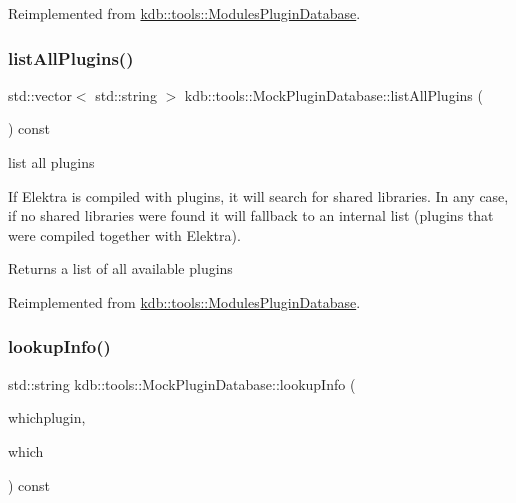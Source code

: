 Reimplemented from \hyperlink{classkdb_1_1tools_1_1ModulesPluginDatabase_a0e81e1b7b296a52f8040fd966b461c3a}{kdb\+::tools\+::\+Modules\+Plugin\+Database}.

\mbox{\label{classkdb_1_1tools_1_1MockPluginDatabase_a3663848683953bfad7123c48c00ab404}} 
\subsubsection{\texorpdfstring{list\+All\+Plugins()}{listAllPlugins()}}
{\footnotesize\ttfamily std\+::vector$<$ std\+::string $>$ kdb\+::tools\+::\+Mock\+Plugin\+Database\+::list\+All\+Plugins (\begin{DoxyParamCaption}{ }\end{DoxyParamCaption}) const\hspace{0.3cm}{\ttfamily [virtual]}}



list all plugins 

If Elektra is compiled with plugins, it will search for shared libraries. In any case, if no shared libraries were found it will fallback to an internal list (plugins that were compiled together with Elektra).

\begin{DoxyReturn}{Returns}
a list of all available plugins 
\end{DoxyReturn}


Reimplemented from \hyperlink{classkdb_1_1tools_1_1ModulesPluginDatabase_a3fa5a08caf47cb79f9889641a96f197b}{kdb\+::tools\+::\+Modules\+Plugin\+Database}.

\mbox{\label{classkdb_1_1tools_1_1MockPluginDatabase_ae352c27aa51bc8c2ea8c708d14f6fc76}} 
\subsubsection{\texorpdfstring{lookup\+Info()}{lookupInfo()}}
{\footnotesize\ttfamily std\+::string kdb\+::tools\+::\+Mock\+Plugin\+Database\+::lookup\+Info (\begin{DoxyParamCaption}\item[{\hyperlink{classkdb_1_1tools_1_1PluginSpec}{Plugin\+Spec} const \&}]{whichplugin,  }\item[{std\+::string const \&}]{which }\end{DoxyParamCaption}) const\hspace{0.3cm}{\ttfamily [virtual]}}



